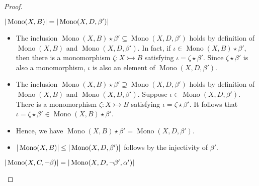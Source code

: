 \begin{proof}
    \label{proof:dcomp_w_u}
\begin{claim}
    $|\operatorname{Mono}(X, B)| = |\operatorname{Mono}(X, D, \beta')|$
\end{claim}
\begin{itemize} 
    \item The inclusion \(\operatorname{Mono}(X, B) \star \beta' \subseteq \operatorname{Mono}(X, D, \beta')\) holds by definition of $\operatorname{Mono}(X, B)$ and $\operatorname{Mono}(X, D, \beta')$. 
    In fact, if \(\iota  \in \operatorname{Mono}(X, B) \star \beta' \), then there is a monomorphism \(\zeta : X \rightarrowtail B\) satisfying \(\iota = \zeta \star \beta'\). Since $\zeta \star \beta'$ is also a monomorphism, \(\iota\) is also an element of \(\operatorname{Mono}(X, D, \beta')\).
    \item The inclusion \(\operatorname{Mono}(X, B) \star \beta' \supseteq \operatorname{Mono}(X, D, \beta')\) holds by definition of $\operatorname{Mono}(X, B)$ and $\operatorname{Mono}(X, D, \beta')$.
    Suppose \(\iota \in \operatorname{Mono}(X, D, \beta')\). There is a monomorphism \(\zeta : X \rightarrowtail B\) satisfying \(\iota = \zeta \star \beta'\). It follows that \(\iota = \zeta \star \beta' \in \operatorname{Mono}(X, B) \star \beta'\).
    \item Hence, we have \(\operatorname{Mono}(X, B) \star \beta' = \operatorname{Mono}(X, D, \beta')\).
    \item $|\operatorname{Mono}(X, B)| \leq |\operatorname{Mono}(X, D, \beta')|$ follows by the injectivity of $\beta'$.
\end{itemize}
\begin{claim}
     $|\operatorname{Mono}(X, C, \lnot \beta)| = |\operatorname{Mono}(X, D, \lnot \beta', \alpha')|$
   \end{claim}
    \begin{itemize}

\end{itemize}
\end{proof}
